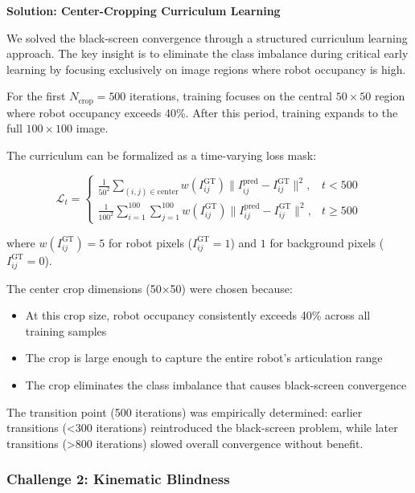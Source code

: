 \documentclass[12pt,a4paper,oneside]{report}
\begin{document}
\textbf{Solution: Center-Cropping Curriculum Learning}

We solved the black-screen convergence through a structured curriculum learning approach. The key insight is to eliminate the class imbalance during critical early learning by focusing exclusively on image regions where robot occupancy is high.

For the first $N_{\text{crop}} = 500$ iterations, training focuses on the central $50 \times 50$ region where robot occupancy exceeds 40\%. After this period, training expands to the full $100 \times 100$ image.

The curriculum can be formalized as a time-varying loss mask:

\begin{equation}
\mathcal{L}_t = \begin{cases}
\frac{1}{50^2} \sum_{(i,j) \in \text{center}} w(I_{ij}^{\text{GT}}) \|I_{ij}^{\text{pred}} - I_{ij}^{\text{GT}}\|^2, & t < 500 \\
\frac{1}{100^2} \sum_{i=1}^{100}\sum_{j=1}^{100} w(I_{ij}^{\text{GT}}) \|I_{ij}^{\text{pred}} - I_{ij}^{\text{GT}}\|^2, & t \geq 500
\end{cases}
\end{equation}

where $w(I_{ij}^{\text{GT}}) = 5$ for robot pixels ($I_{ij}^{\text{GT}} = 1$) and $1$ for background pixels ($I_{ij}^{\text{GT}} = 0$).

The center crop dimensions (50×50) were chosen because:

\begin{itemize}
    \item At this crop size, robot occupancy consistently exceeds 40\% across all training samples
    \item The crop is large enough to capture the entire robot's articulation range
    \item The crop eliminates the class imbalance that causes black-screen convergence
\end{itemize}

The transition point (500 iterations) was empirically determined: earlier transitions (<300 iterations) reintroduced the black-screen problem, while later transitions (>800 iterations) slowed overall convergence without benefit.

\subsubsection{Challenge 2: Kinematic Blindness}
\label{subsubsec:challenge_2_kinematic_blindness}
\end{document}
